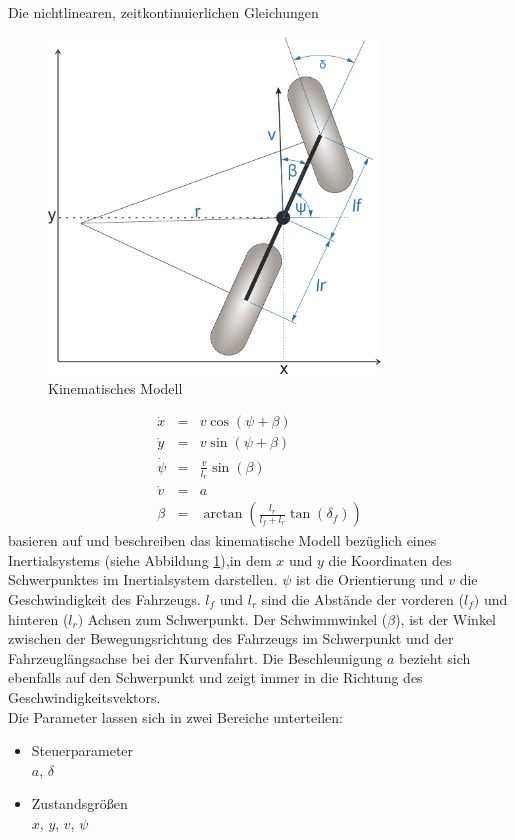 \documentclass{like}
\begin{document}
Die nichtlinearen, zeitkontinuierlichen Gleichungen 

\begin{figure}[ht!]
	\centering
	\includegraphics[width=250pt]{Abbildungen/kinBicycle.png}
	\caption{Kinematisches Modell}
	\label{fig:kinmodel}
\end{figure}

\begin{eqnarray}
\label{kinDiscrete}
\dot{x}   &= &v  \cos(\psi + \beta)\\
\dot{y}   &= &v  \sin(\psi + \beta)\\
\dot{\psi} &= &\frac{v}{l_r} \sin(\beta) \\
\dot{v}    &= &a \\
\beta      &= &\arctan \left( \frac{l_r}{l_f + l_r} \tan(\delta_f) \right) \label{compute_beta}
\end{eqnarray}
basieren auf \cite{rajamani2011vehicle, 7225830} und beschreiben das kinematische Modell bezüglich eines Inertialsystems (siehe Abbildung \ref{fig:kinmodel}),in dem \(x\) und \(y\) die Koordinaten des Schwerpunktes im Inertialsystem darstellen. 
\(\psi\) ist die Orientierung und \(v\) die Geschwindigkeit des Fahrzeugs. \(l_f\) und \(l_r\) sind die Abstände der vorderen (\(l_f)\) und hinteren (\(l_r)\) Achsen zum Schwerpunkt.
Der Schwimmwinkel (\(\beta\)), ist der Winkel  zwischen der Bewegungsrichtung des Fahrzeugs im Schwerpunkt und der Fahrzeuglängsachse bei der Kurvenfahrt. Die Beschleunigung \(a\) bezieht sich ebenfalls auf den Schwerpunkt und zeigt immer in die Richtung des Geschwindigkeitsvektors. \\
Die Parameter lassen sich in zwei Bereiche unterteilen:

\begin{itemize}
	\item Steuerparameter  \\
	\(a\), \(\delta\)
	\item Zustandsgrößen \\
	\(x\), \(y\), \(v\), \(\psi\)
	
\end{itemize}
\end{document}
